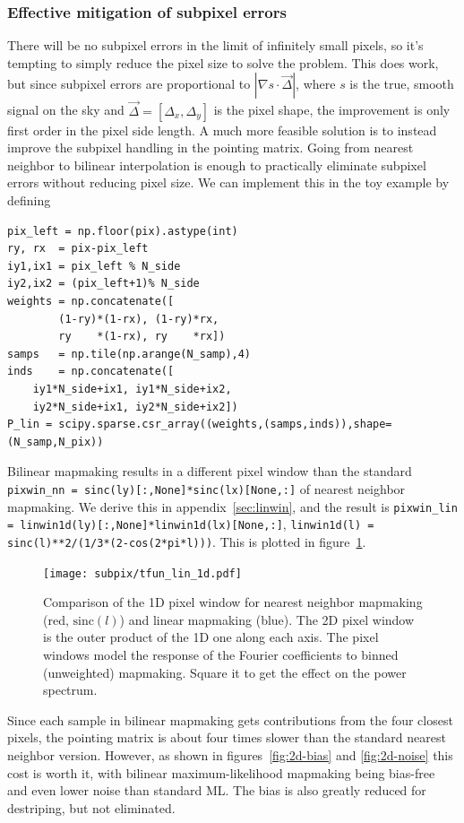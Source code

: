 \documentclass{aa}
\begin{document}
\subsubsection{Effective mitigation of subpixel errors}
There will be no subpixel errors in the limit of infinitely small pixels,
so it's tempting to simply reduce the pixel size to solve the problem. This
does work, but since subpixel errors are proportional to $|\nabla s \cdot \vec \Delta|$,
where $s$ is the true, smooth signal on the sky and $\vec \Delta = [\Delta_x,\Delta_y]$
is the pixel shape, the improvement is only first order in the pixel side length.
A much more feasible solution is to instead improve the subpixel handling in the
pointing matrix. Going from nearest neighbor to bilinear interpolation is enough
to practically eliminate subpixel errors without reducing pixel size. We can
implement this in the toy example by defining
\begin{lstlisting}
pix_left = np.floor(pix).astype(int)
ry, rx  = pix-pix_left
iy1,ix1 = pix_left % N_side
iy2,ix2 = (pix_left+1)% N_side
weights = np.concatenate([
		(1-ry)*(1-rx), (1-ry)*rx,
		ry    *(1-rx), ry    *rx])
samps   = np.tile(np.arange(N_samp),4)
inds    = np.concatenate([
	iy1*N_side+ix1, iy1*N_side+ix2,
	iy2*N_side+ix1, iy2*N_side+ix2])
P_lin = scipy.sparse.csr_array((weights,(samps,inds)),shape=(N_samp,N_pix))
\end{lstlisting}
Bilinear mapmaking results in a different pixel window than
the standard \lstinline{pixwin_nn = sinc(ly)[:,None]*sinc(lx)[None,:]}
of nearest neighbor mapmaking. We derive this in appendix~\ref{sec:linwin},
and the result is \lstinline{pixwin_lin = linwin1d(ly)[:,None]*linwin1d(lx)[None,:]},
\lstinline{linwin1d(l) = sinc(l)**2/(1/3*(2-cos(2*pi*l)))}. This is plotted in
figure~\ref{fig:linwin1d}.

\begin{figure}
	\centering
	\texttt{[image: subpix/tfun\_lin\_1d.pdf]}
	\caption{Comparison of the 1D pixel window for nearest neighbor
	mapmaking (red, $\text{sinc}(l)$) and linear mapmaking (blue). The 2D pixel window
	is the outer product of the 1D one along each axis. The pixel
	windows model the response of the Fourier coefficients to
	binned (unweighted) mapmaking. Square it to get the effect on
	the power spectrum.}
	\label{fig:linwin1d}
\end{figure}

Since each sample in bilinear mapmaking gets contributions from the four closest pixels,
the pointing matrix is about four times slower than the standard nearest neighbor
version. However, as shown in figures~\ref{fig:2d-bias} and \ref{fig:2d-noise}
this cost is worth it, with bilinear maximum-likelihood mapmaking being bias-free
and even lower noise than standard ML. The bias is also greatly reduced for
destriping, but not eliminated.
\end{document}
